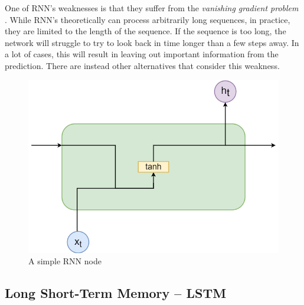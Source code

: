 \documentclass[nofilelist]{cslthse-msc}
\begin{document}
One of RNN's weaknesses is that they suffer from the \textit{vanishing gradient problem} \citep{hochreiter1998}. While RNN's theoretically can process arbitrarily long sequences, in practice, they are limited to the length of the sequence. If the sequence is too long, the network will struggle to try to look back in time longer than a few steps away. In a lot of cases, this will result in leaving out important information from the prediction. There are instead other alternatives that consider this weakness. 



 
 \begin{figure}[H]
    \centering
    \includegraphics[scale=0.35]{msccls/explanatory_images/rnn.png}
    \caption{A simple RNN node}
    \label{fig:rnn_node}
\end{figure}



\subsection{Long Short-Term Memory -- LSTM}
\end{document}
